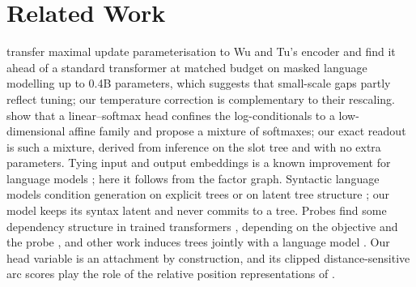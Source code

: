 \section{Related Work}
\label{sec:related}

\citet{kuang2026scaling} transfer maximal update parameterisation \citep{yang2022tensor} to Wu
and Tu's encoder and find it ahead of a standard transformer at matched budget on masked language
modelling up to 0.4B parameters, which suggests that small-scale gaps partly reflect tuning; our
temperature correction is complementary to their rescaling. \citet{yang2018breaking} show that a linear--softmax head confines the log-conditionals to a
low-dimensional affine family and propose a mixture of softmaxes; our exact readout is such a
mixture, derived from inference on the slot tree and with no extra parameters. Tying input and
output embeddings is a known improvement for language models \citep{press2017using}; here it
follows from the factor graph. Syntactic language models condition generation on explicit trees
\citep{chelba1998exploiting,dyer2016recurrent,sartran2022transformer} or on latent tree
structure \citep{shen2019ordered}; our model keeps its syntax latent and never commits to a tree.
Probes find some dependency structure in trained transformers
\citep{hewitt2019structural,clark2019what,htut2019attention}, depending on the objective and the
probe \citep{ravishankar2021attention}, and other work induces trees jointly with a language
model \citep{shen2021structformer,shen2022udgn}. Our
head variable is an attachment by construction, and its clipped distance-sensitive arc scores
play the role of the relative position representations of \citet{shaw2018self}.
